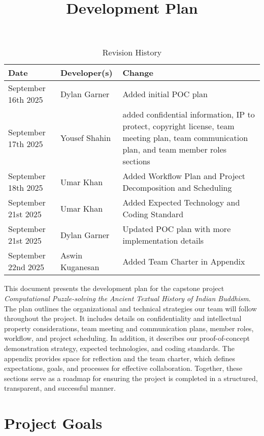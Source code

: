 \documentclass{article}
\title{Development Plan\\\progname}
\author{\authname}
\date{}
\begin{document}
\maketitle

\begin{table}[hp]
\caption{Revision History} \label{TblRevisionHistory}
\begin{tabularx}{\textwidth}{llX}
\toprule
\textbf{Date} & \textbf{Developer(s)} & \textbf{Change}\\
\midrule
September 16th 2025 & Dylan Garner & Added initial POC plan\\
September 17th 2025 & Yousef Shahin & added confidential information, IP to protect, copyright license, team meeting plan, team communication plan, and team member roles sections\\
September 18th 2025 & Umar Khan & Added Workflow Plan and Project Decomposition and Scheduling\\
September 21st 2025 & Umar Khan & Added Expected Technology and Coding Standard \\
September 21st 2025 & Dylan Garner & Updated POC plan with more implementation details\\
September 22nd 2025 & Aswin Kuganesan & Added Team Charter in Appendix\\

\bottomrule
\end{tabularx}
\end{table}

\newpage{}

This document presents the development plan for the capstone project
\textit{Computational Puzzle-solving the Ancient Textual History of Indian Buddhism}.
The plan outlines the organizational and technical strategies our team will follow
throughout the project. It includes details on confidentiality and intellectual
property considerations, team meeting and communication plans, member roles, workflow,
and project scheduling. In addition, it describes our proof-of-concept demonstration
strategy, expected technologies, and coding standards. The appendix provides space
for reflection and the team charter, which defines expectations, goals, and processes
for effective collaboration. Together, these sections serve as a roadmap for ensuring
the project is completed in a structured, transparent, and successful manner.

\section{Project Goals}
\end{document}
